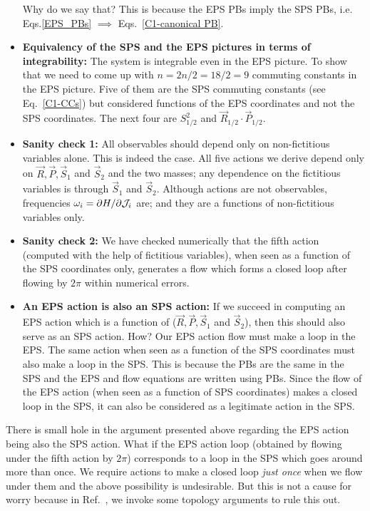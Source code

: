 \begin{itemize}
Why do we say that? This is because the EPS PBs imply the SPS PBs, i.e.
Eqs.\eqref{EPS_PBs} $\implies$  Eqs.~\ref{C1-canonical PB}.
\item \textbf{Equivalency of the SPS and the EPS pictures in terms of integrability:}
The system is integrable even in the EPS picture. To show that
we need to come up with $n = 2n/2 = 18/2 = 9$ commuting constants in the EPS picture.
Five of them are the SPS commuting constants (see Eq.~\eqref{C1-CCs})
but considered functions of the EPS coordinates and not the SPS coordinates.
The next four are $S^2_{1/2}$ and $\vec{R}_{1/2} \cdot \vec{P}_{1/2}$.
\item \textbf{Sanity check 1:} All observables should depend only on non-fictitious variables alone. This is indeed the case. All five actions we derive depend only 
on $\vec{R}, \vec{P}, \vec{S}_1$ and $\vec{S}_2$ and the two masses; 
any dependence on the fictitious variables is through $\vec{S}_1$ and $\vec{S}_2$.
Although actions are not observables, frequencies $\omega_i = \partial H / \partial \mathcal{J}_i$
are; and they are a functions of non-fictitious variables only.
\item \textbf{Sanity check 2:} We have checked numerically that the fifth action
(computed with the help of fictitious variables), when seen as a function of 
the SPS coordinates only, generates a flow which forms a closed loop after 
flowing by $2 \pi$ within numerical errors.
\item \textbf{An EPS action is also an SPS action:} If we succeed in computing
an EPS action which is a function of ($\vec{R}, \vec{P}, \vec{S}_1$ and $\vec{S}_2$),
then this should also serve as an SPS action. How? Our EPS action flow 
must make a loop in the EPS. The same action when seen as  a function of the SPS
coordinates must also make a loop in the SPS. This is because the PBs are the 
same in the SPS and the EPS and flow equations are written using PBs. 
Since the flow of the EPS action (when seen as  a function of SPS coordinates)
makes a closed loop in the SPS, it can also be considered as a legitimate action in
the SPS.
\end{itemize}





\hfill \break


\begin{definition}[label=def:F]
There is small hole in the argument presented above regarding the EPS
action being also the SPS action. What if the EPS action loop 
(obtained by flowing under the fifth action by $2 \pi$)
corresponds to a loop in the SPS which goes around more than once.
We require actions to make a closed loop  \textit{just once}
when we flow under them and the above possibility is undesirable.
But this is not  a cause for worry because in Ref.~\cite{tanay2021action},
we invoke some topology arguments to rule this out.
\end{definition}

